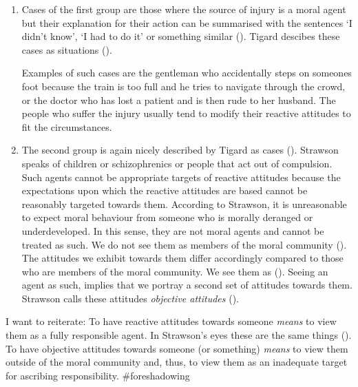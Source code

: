 \documentclass{article}
\begin{document}
\begin{enumerate}
	\item Cases of the first group are those where the source of injury is a
		moral agent but their explanation for their action can be
		summarised with the sentences `I didn't know', `I had to do it'
		or something similar (\cite[p.7-8]{Strawson1962}). Tigard
		descibes these cases as situations  
		(\cite[p.5]{Tigard_2020}).

		Examples of such cases are the
		gentleman who accidentally steps on someones foot because the train is too
		full and he tries to navigate through the crowd, or the doctor
		who has lost a patient and is then rude to her husband. The
		people who suffer the injury usually tend to modify their
		reactive attitudes to fit the circumstances.
	\item The second group is again nicely described by Tigard as cases
		 (\cite[p.5]{Tigard_2020}). Strawson speaks of children
		or schizophrenics or people that act out of compulsion. Such
		agents cannot be appropriate targets of reactive attitudes
		because the expectations upon which the reactive attitudes are
		based cannot be reasonably targeted towards them. According to
		Strawson, it is unreasonable to expect moral behaviour from
		someone who is morally deranged or underdeveloped. In this
		sense, they are not moral agents and cannot be treated as such.
		We do not see them as members of the moral community
		(\cite[p.18]{Strawson1962}). The attitudes we exhibit towards
		them differ accordingly compared to those who are members of the
		moral community. We see them as 
		(\cite[p.8]{Strawson1962}). Seeing an agent as such, implies
		that we portray a second set of attitudes towards them. Strawson
		calls these attitudes \textit{objective attitudes}
		(\cite[p.9]{Strawson1962}). 
\end{enumerate}

I want to reiterate: To have reactive attitudes towards someone \textit{means}
to view them as a fully responsible agent. In Strawson's eyes these are the same
things (\cite[p.23]{Strawson1962}). To have objective attitudes towards someone (or something)
\textit{means} to view them outside of the moral community and, thus, to view
them as an inadequate target for ascribing responsibility. \#foreshadowing\\
\end{document}
